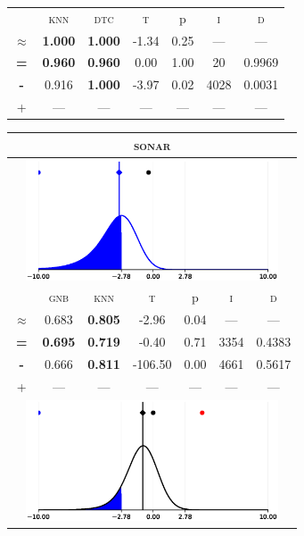 \begin{tabular}{c||cc||c|c|c||c}
\midrule	&\textsc{knn} & \textsc{dtc} & \textsc{t} & p & \textsc{i} & \textsc{d}\\
	\color{black} $\approx$ & \color{black} \bfseries 1.000 &\color{black}  \bfseries 1.000 & -1.34 & 0.25 & --- & ---\\\midrule
	{\bfseries\color{black}\tiny=}& \color{black} \bfseries 0.960 & \color{black} \bfseries 0.960 & 0.00 & 1.00 & 20 & \color{black} 0.9969\\
	{\bfseries\color{blue}\tiny-}& \color{blue}  0.916 & \color{blue} \bfseries 1.000 & -3.97 & 0.02 & 4028 & \color{blue} 0.0031\\
	{\tiny+}& --- & --- & --- & --- & --- & ---\\
\bottomrule\end{tabular}


\begin{tabular}{c||cc||c|c|c||c}
	\toprule
	\multicolumn{7}{c}{\textsc{sonar}}\\
	\bottomrule
	\multicolumn{7}{c}{\includegraphics[width=7.5cm, trim=30 0 30 0]{figures/sonar_0.eps}}\\

\midrule	&\textsc{gnb} & \textsc{knn} & \textsc{t} & p & \textsc{i} & \textsc{d}\\
	\color{blue} $\approx$ & \color{blue}  0.683 &\color{blue}  \bfseries 0.805 & -2.96 & 0.04 & --- & ---\\\midrule
	{\bfseries\color{black}\tiny=}& \color{black} \bfseries 0.695 & \color{black} \bfseries 0.719 & -0.40 & 0.71 & 3354 & \color{black} 0.4383\\
	{\bfseries\color{blue}\tiny-}& \color{blue}  0.666 & \color{blue} \bfseries 0.811 & -106.50 & 0.00 & 4661 & \color{blue} 0.5617\\
	{\tiny+}& --- & --- & --- & --- & --- & ---\\
	\bottomrule
	\multicolumn{7}{c}{\includegraphics[width=7.5cm, trim=30 0 30 0]{figures/sonar_1.eps}}\\


\end{tabular}
